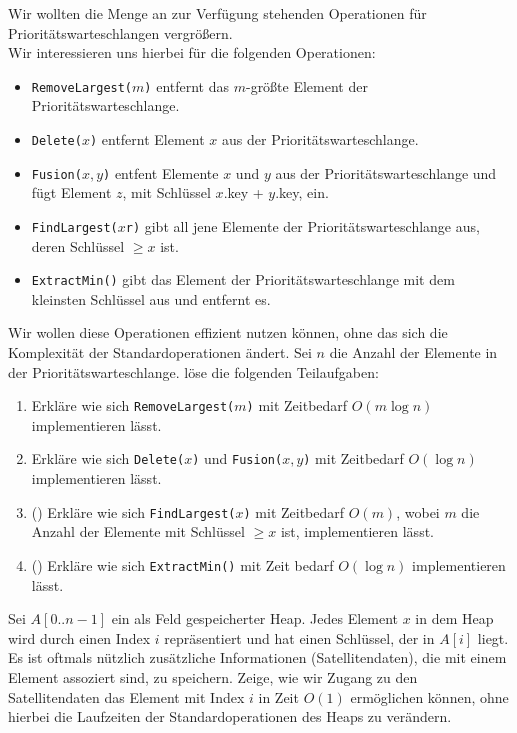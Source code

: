 \documentclass{uebung_cs}
\begin{document}
\begin{aufgabe}
	Wir wollten die Menge an zur Verfügung stehenden Operationen für Prioritätswarteschlangen vergrößern.\\
	Wir interessieren uns hierbei für die folgenden Operationen:
	\begin{itemize}
		\item \texttt{RemoveLargest($m$)} entfernt das $m$-größte Element der Prioritätswarteschlange.
		\item \texttt{Delete($x$)} entfernt Element $x$ aus der Prioritätswarteschlange.
		\item \texttt{Fusion($x,y$)} entfent Elemente $x$ und $y$ aus der Prioritätswarteschlange und fügt Element $z$, mit Schlüssel $x$.key + $y$.key, ein.
		\item \texttt{FindLargest($x$r)} gibt all jene Elemente der Prioritätswarteschlange aus, deren Schlüssel $\geq x$ ist.
		\item \texttt{ExtractMin()} gibt das Element der Prioritätswarteschlange mit dem kleinsten Schlüssel aus und entfernt es.
	\end{itemize}
	Wir wollen diese Operationen effizient nutzen können, ohne das sich die Komplexität der Standardoperationen ändert.
	Sei $n$ die Anzahl der Elemente in der Prioritätswarteschlange.
	löse die folgenden Teilaufgaben:
	\begin{enumerate}
		\item Erkläre wie sich \texttt{RemoveLargest($m$)} mit Zeitbedarf $O(m\log n)$ implementieren lässt.
		\item Erkläre wie sich \texttt{Delete($x$)} und \texttt{Fusion($x,y$)} mit Zeitbedarf $O(\log n)$ implementieren lässt.
		\item (\hard) Erkläre wie sich \texttt{FindLargest($x$)} mit Zeitbedarf $O(m)$, wobei $m$ die Anzahl der Elemente mit Schlüssel $\geq x$ ist, implementieren lässt.
		\item (\hard) Erkläre wie sich \texttt{ExtractMin()} mit Zeit bedarf $O(\log n)$ implementieren lässt.
	\end{enumerate}
\end{aufgabe}

\begin{aufgabe}[Satellitendaten]
	Sei $A[0..n-1]$ ein als Feld gespeicherter Heap.
	Jedes Element $x$ in dem Heap wird durch einen Index $i$ repräsentiert und hat einen Schlüssel, der in $A[i]$ liegt.
	Es ist oftmals nützlich zusätzliche Informationen (Satellitendaten), die mit einem Element assoziert sind, zu speichern.
	Zeige, wie wir Zugang zu den Satellitendaten das Element mit Index $i$ in Zeit $O(1)$ ermöglichen können, ohne hierbei die Laufzeiten der Standardoperationen des Heaps zu verändern.
\end{aufgabe}
\end{document}
